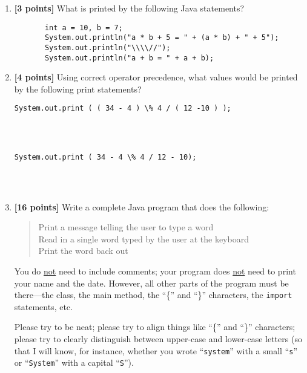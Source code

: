 \documentclass[11pt]{report}
\begin{document}
\begin{enumerate}
\bigskip

\item {\bf [3 points]}
What is printed by the following Java statements? 
\begin{verbatim}
       int a = 10, b = 7;
       System.out.println("a * b + 5 = " + (a * b) + " + 5");
       System.out.println("\\\\//");
       System.out.println("a + b = " + a + b);
\end{verbatim}

\vspace{1.0in}
\item {\bf [4 points]}
Using correct operator precedence, what values would be printed by the following
print statements?
\begin{verbatim}
System.out.print ( ( 34 - 4 ) \% 4 / ( 12 -10 ) );




\end{verbatim}
\begin{verbatim}
System.out.print ( 34 - 4 \% 4 / 12 - 10); 




\end{verbatim}

\item {\bf [16 points]}
Write a complete Java program that does the following: 
\begin{quote}
Print a message telling the user to type a word\\
Read in a single word typed by the user at the keyboard\\
Print the word back out
\end{quote}
You do \underline{not} need to include 
comments; your program does \underline{not} need to print your 
name and the date. However, all other parts of the program must be
there---the class, the main method, the ``\{'' and ``\}'' characters,
the {\tt import} statements, etc.

Please try to be neat; please try to align things like ``\{'' and ``\}''
characters; please try to clearly distinguish between upper-case and
lower-case letters (so that I will know, for instance, whether
you wrote ``{\tt system}'' with a small ``{\tt s}'' or ``{\tt System}''
with a capital ``{\tt S}'').

\vspace{3in}


\end{enumerate}
\end{document}
